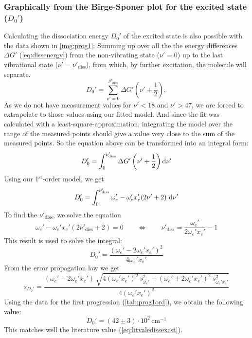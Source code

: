 \subsubsection{Graphically from the Birge-Sponer plot for the excited state ($D_0'$)}
Calculating the dissociation energy $ D_0'$ of the excited state
is also possible with the data shown in \autoref{img:prog1}:
Summing up over all the
the energy differences $\Delta G'$ (\autoref{eq:dissenergy}) from the non-vibrating state ($\nu'=0$) up to the last
vibrational state ($\nu'=\nu'_{\text{diss}}$), from which, by further excitation, the molecule will separate.
\begin{equation}
\label{eq:dissenergy2}
  D_0' = \sum_{\nu'=0}^{\nu'_{\text{diss}}} \Delta G' \left( \nu' + \frac{1}{2} \right),
\end{equation}
As we do not have measurement values for $\nu'<18$ and $\nu'>47$,
we are forced to extrapolate to those values using our fitted model.
And since the fit was calculated with a least-square-approximation,
integrating the model over the range of the measured points should give a value
very close to the sum of the measured points.
So the equation above can be transformed into an integral form:
\begin{equation}
  D_0' = \int_{0}^{\nu'_{\text{diss}}} \Delta G'\left( \nu' + \frac{1}{2} \right) \mathrm{d} \nu'
\end{equation}
Using our 1$^{\text{st}}$-order model, we get
\begin{equation}
D_0' = \int_{0}^{\nu'_{\text{diss}}} \omega_e' - \omega_e' x_e' (2\nu' + 2) \ \difd \nu'
\end{equation}
To find the $\nu'_{\text{diss}}$, we solve the equation
\begin{equation}
  \omega_e' - \omega_e' x_e' (2\nu'_{\text{diss}} + 2) = 0 \qquad \Leftrightarrow \qquad \nu'_{\text{diss}} =
  \frac{\omega_e'}{2\omega_e' x_e'} - 1
\end{equation}
This result is used to solve the integral:
\begin{equation}
  D_0' = \frac{(\omega_e'-2\omega_e' x_e')^2}{4\omega_e' x_e'}
\end{equation}
From the error propagation law we get
\begin{equation}
  s_{D_0'} = \frac
  {(\omega_e'-2\omega_e' x_e') \ \sqrt{4(\omega_e' x_e')^2 \ s_{\omega_e'}^2 + (\omega_e'+2\omega_e' x_e')^2 \ s_{\omega_e' x_e'}^2}}
  {4(\omega_e' x_e')^2}
\end{equation}
Using the data for the first progression (\autoref{tab:prog1ord}), we obtain the following value:
\begin{equation}
    D_0' = (42 \pm 3) \cdot 10^2\, \text{cm}^{-1}
    \end{equation}
This matches well the literature value (\autoref{eq:litvaledissexcst}).

